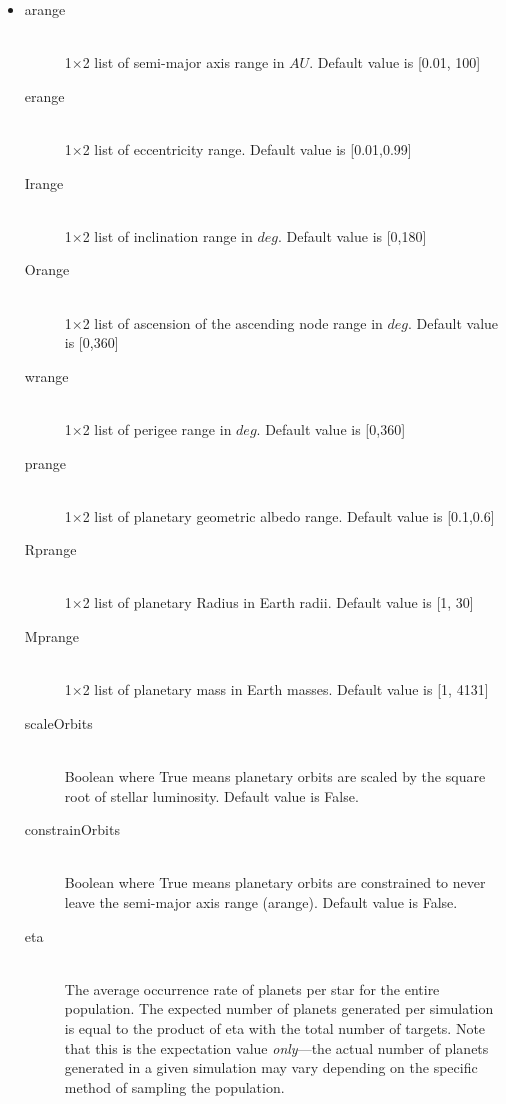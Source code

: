 \documentclass[cleanfoot]{asme2ej}
\begin{document}
\begin{itemize}
\item
\begin{description}
    \item[arange] \hfill \\
    1$\times$2 list of semi-major axis range in $ AU $. Default value is [0.01, 100]
    \item[erange] \hfill \\
    1$\times$2 list of eccentricity range.  Default value is [0.01,0.99]
    \item[Irange] \hfill \\
    1$\times$2 list of inclination range in $ deg $.  Default value is [0,180]
    \item[Orange] \hfill \\
    1$\times$2 list of ascension of the ascending node range in $ deg $.  Default value is [0,360]
    \item[wrange] \hfill \\
    1$\times$2 list of perigee range in $ deg $.  Default value is [0,360]
    \item[prange] \hfill \\
    1$\times$2 list of planetary geometric albedo range.  Default value is [0.1,0.6]
    \item[Rprange] \hfill \\
    1$\times$2 list of planetary Radius in Earth radii.  Default value is [1, 30]
    \item[Mprange] \hfill \\
    1$\times$2 list of planetary mass in Earth masses.  Default value is [1, 4131]
    \item [scaleOrbits] \hfill \\
    Boolean where True means planetary orbits are scaled by the square root of stellar luminosity. Default value is False.
    \item[constrainOrbits] \hfill \\
    Boolean where True means planetary orbits are constrained to never leave the semi-major axis range (arange). Default value is False.
    \item[eta] \hfill \\
    The average occurrence rate of planets per star for the entire population.  The expected number of planets generated per simulation is equal to the product of eta with the total number of targets.  Note that this is the expectation value \emph{only}---the actual number of planets generated in a given simulation may vary depending on the specific method of sampling the population.
\end{description}
\end{itemize}
\end{document}
